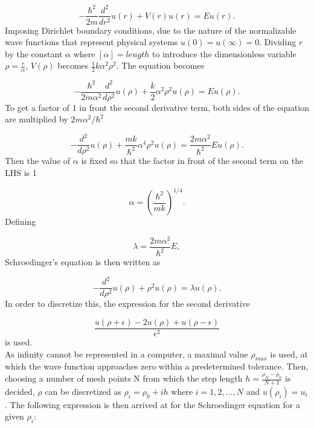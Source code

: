 \documentclass[10pt,a4paper]{article}
\begin{document}
\begin{equation*}
  -\frac{\hbar^2}{2 m} \frac{d^2}{dr^2}u(r)+ V(r) u(r) = E u(r).
\end{equation*}
Imposing Dirichlet boundary conditions, due to the nature of the normalizable wave functions that represent physical systems $u(0)=u(\infty)=0$. Dividing $r$ by the constant $\alpha$ where $[\alpha] = length$ to introduce the dimensionless variable $\rho =\frac{r}{\alpha}$, $V(\rho)$ becomes $\frac{1}{2}k\alpha^2 \rho^2$. The equation becomes

\begin{equation*}
  -\frac{\hbar^2}{2 m \alpha^2} \frac{d^2}{d\rho^2} u(\rho) 
       + \frac{k}{2} \alpha^2\rho^2u(\rho)  = E u(\rho) .
\end{equation*}
To get a factor of 1 in front the second derivative term, both sides of the equation are multiplied by $2m\alpha^2/\hbar^2$

\begin{equation*}
  -\frac{d^2}{d\rho^2} u(\rho) 
       + \frac{mk}{\hbar^2} \alpha^4\rho^2u(\rho)  = \frac{2m\alpha^2}{\hbar^2}E u(\rho) .
\end{equation*}
Then the value of $\alpha$ is fixed so that the factor in front of the second term on the LHS is 1

\begin{equation*}
\alpha = \left(\frac{\hbar^2}{mk}\right)^{1/4}.
\end{equation*}
Defining

\begin{equation*}
\lambda = \frac{2m\alpha^2}{\hbar^2}E,
\end{equation*}
Schroedinger's equation is then written as

\begin{equation*}
  -\frac{d^2}{d\rho^2} u(\rho) + \rho^2u(\rho)  = \lambda u(\rho) .
\end{equation*}
In order to discretize this, the expression for the second derivative

\begin{equation}
\label{2nd derivative}
  \frac{u(\rho+\epsilon) -2u(\rho) +u(\rho-\epsilon)}{\epsilon^2}
\end{equation}
is used.\\As infinity cannot be represented in a computer, a maximal value $\rho_{max}$ is used, at which the wave function approaches zero within a predetermined tolerance. Then, choosing a number of mesh points N from which the step length $h=\frac{\rho_N-\rho_0 }{N+1}$ is decided, $\rho$ can be discretized as $\rho_i= \rho_0 + ih$ where $i=1,2,\dots , N$ and $u(\rho_i)=u_i$. The following expression is then arrived at for the Schroedinger equation for a given $\rho_i$:
\end{document}
